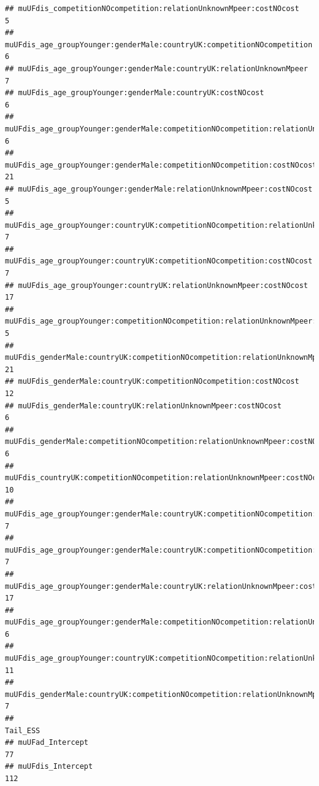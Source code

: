 \documentclass[
]{article}
\begin{document}
\begin{verbatim}
## muUFdis_competitionNOcompetition:relationUnknownMpeer:costNOcost                                    5
## muUFdis_age_groupYounger:genderMale:countryUK:competitionNOcompetition                              6
## muUFdis_age_groupYounger:genderMale:countryUK:relationUnknownMpeer                                  7
## muUFdis_age_groupYounger:genderMale:countryUK:costNOcost                                            6
## muUFdis_age_groupYounger:genderMale:competitionNOcompetition:relationUnknownMpeer                   6
## muUFdis_age_groupYounger:genderMale:competitionNOcompetition:costNOcost                            21
## muUFdis_age_groupYounger:genderMale:relationUnknownMpeer:costNOcost                                 5
## muUFdis_age_groupYounger:countryUK:competitionNOcompetition:relationUnknownMpeer                    7
## muUFdis_age_groupYounger:countryUK:competitionNOcompetition:costNOcost                              7
## muUFdis_age_groupYounger:countryUK:relationUnknownMpeer:costNOcost                                 17
## muUFdis_age_groupYounger:competitionNOcompetition:relationUnknownMpeer:costNOcost                   5
## muUFdis_genderMale:countryUK:competitionNOcompetition:relationUnknownMpeer                         21
## muUFdis_genderMale:countryUK:competitionNOcompetition:costNOcost                                   12
## muUFdis_genderMale:countryUK:relationUnknownMpeer:costNOcost                                        6
## muUFdis_genderMale:competitionNOcompetition:relationUnknownMpeer:costNOcost                         6
## muUFdis_countryUK:competitionNOcompetition:relationUnknownMpeer:costNOcost                         10
## muUFdis_age_groupYounger:genderMale:countryUK:competitionNOcompetition:relationUnknownMpeer         7
## muUFdis_age_groupYounger:genderMale:countryUK:competitionNOcompetition:costNOcost                   7
## muUFdis_age_groupYounger:genderMale:countryUK:relationUnknownMpeer:costNOcost                      17
## muUFdis_age_groupYounger:genderMale:competitionNOcompetition:relationUnknownMpeer:costNOcost        6
## muUFdis_age_groupYounger:countryUK:competitionNOcompetition:relationUnknownMpeer:costNOcost        11
## muUFdis_genderMale:countryUK:competitionNOcompetition:relationUnknownMpeer:costNOcost               7
##                                                                                              Tail_ESS
## muUFad_Intercept                                                                                   77
## muUFdis_Intercept                                                                                 112

\end{verbatim}
\end{document}
